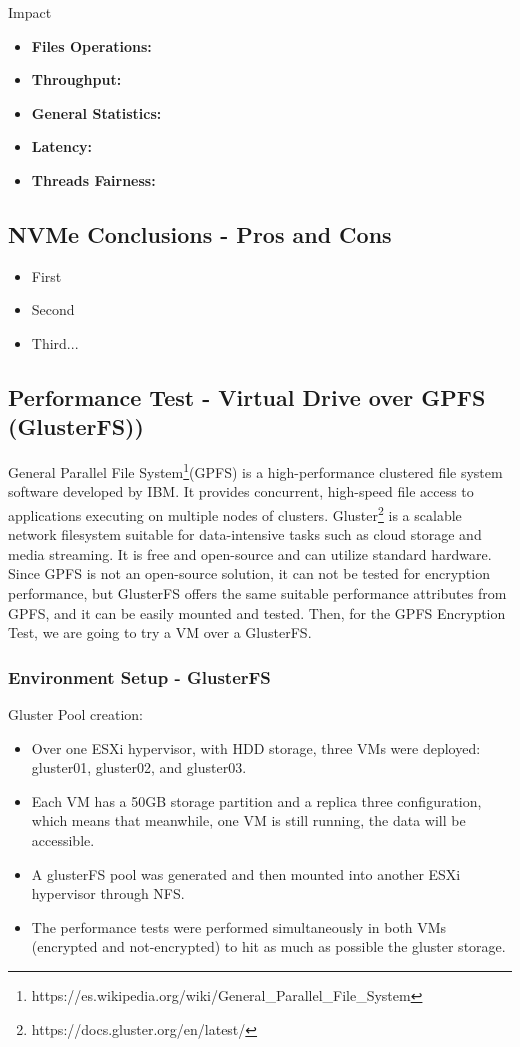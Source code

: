 Impact
\begin{itemize}
  \item \textbf{Files Operations:} 
  \item \textbf{Throughput:} 
  \item \textbf{General Statistics:}
  \item \textbf{Latency:}
  \item \textbf{Threads Fairness:}
\end{itemize}

\newpage
\subsection{NVMe Conclusions - Pros and Cons}
\begin{itemize}
  \item First
  \item Second
  \item Third...
\end{itemize}

\newpage
\subsection{Performance Test - Virtual Drive over GPFS (GlusterFS))}
General Parallel File System\footnote[1]{https://es.wikipedia.org/wiki/General_Parallel_File_System}(GPFS) is a high-performance clustered file system software developed by IBM. It provides concurrent, high-speed file access to applications executing on multiple nodes of clusters.
Gluster\footnote[2]{https://docs.gluster.org/en/latest/} is a scalable network filesystem suitable for data-intensive tasks such as cloud storage and media streaming. It is free and open-source and can utilize standard hardware. 
Since GPFS is not an open-source solution, it can not be tested for encryption performance, but GlusterFS offers the same suitable performance attributes from GPFS, and it can be easily mounted and tested. Then, for the GPFS Encryption Test, we are going to try a VM over a GlusterFS.

\subsubsection{Environment Setup - GlusterFS}
Gluster Pool creation:
\begin{itemize}
  \item Over one ESXi hypervisor, with HDD storage, three VMs were deployed: gluster01, gluster02, and gluster03.
  \item Each VM has a 50GB storage partition and a replica three configuration, which means that meanwhile, one VM is still running, the data will be accessible. 
  \item A glusterFS pool was generated and then mounted into another ESXi hypervisor through NFS.
  \item The performance tests were performed simultaneously in both VMs (encrypted and not-encrypted) to hit as much as possible the gluster storage.
\end{itemize}
